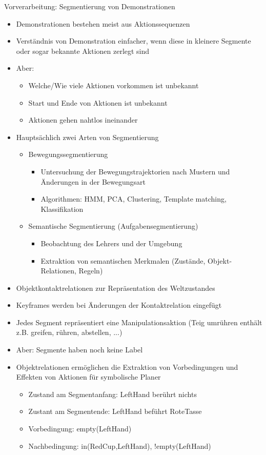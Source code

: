 \documentclass[paper=a4, fontsize=11pt]{scrartcl} %
\numberwithin{equation}{section} %
\numberwithin{figure}{section} %
\numberwithin{table}{section} %
\begin{document}
Vorverarbeitung: Segmentierung von Demonstrationen
\begin{itemize}
\item Demonstrationen bestehen meist aus Aktionssequenzen
\item Verständnis von Demonstration einfacher, wenn diese in kleinere Segmente oder sogar bekannte Aktionen zerlegt sind
\item Aber:
\begin{itemize}
\item Welche/Wie viele Aktionen vorkommen ist unbekannt
\item Start und Ende von Aktionen ist unbekannt
\item Aktionen gehen nahtlos ineinander
\end{itemize}
\item Hauptsächlich zwei Arten von Segmentierung
\begin{itemize}
\item Bewegungssegmentierung
\begin{itemize}
\item Untersuchung der Bewegungstrajektorien nach Mustern und Änderungen in der Bewegungsart
\item Algorithmen: HMM, PCA, Clustering, Template matching, Klassifikation
\end{itemize}
\item Semantische Segmentierung (Aufgabensegmentierung)
\begin{itemize}
\item Beobachtung des Lehrers und der Umgebung
\item Extraktion von semantischen Merkmalen (Zustände, Objekt-Relationen, Regeln)
\end{itemize}
\end{itemize}
\item Objektkontaktrelationen zur Repräsentation des Weltzustandes
\item Keyframes werden bei Änderungen der Kontaktrelation eingefügt
\item Jedes Segment repräsentiert eine Manipulationsaktion (Teig umrühren enthält z.B. greifen, rühren, abstellen, ...)
\item Aber: Segmente haben noch keine Label
\item Objektrelationen ermöglichen die Extraktion von Vorbedingungen und Effekten von Aktionen für symbolische Planer
\begin{itemize}
\item Zustand am Segmentanfang: LeftHand berührt nichts
\item Zustant am Segmentende: LeftHand beführt RoteTasse
\item Vorbedingung: empty(LeftHand)
\item Nachbedingung: in(RedCup,LeftHand), !empty(LeftHand)
\end{itemize}
\end{itemize}
\end{document}
